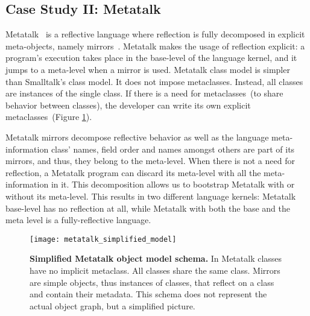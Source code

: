 
\subsection{Case Study II: Metatalk} \label{sec:bootstrap_metatalk}

Metatalk~\cite{Papo11a} is a reflective language where reflection is fully decomposed in explicit meta-objects, namely mirrors~\cite{Brac04b}. Metatalk makes the usage of reflection explicit: a program's execution takes place in the base-level of the language kernel, and it jumps to a meta-level when a mirror is used. Metatalk class model is simpler than Smalltalk's class model. It does not impose metaclasses. Instead, all classes are instances of the single  class. If there is a need for metaclasses~(to share behavior between classes), the developer can write its own explicit metaclasses~(Figure \ref{fig:metatalk_simplified_model}).

Metatalk mirrors decompose reflective behavior as well as the language meta-information \ie class' names, field order and names amongst others are part of its mirrors, and thus, they belong to the meta-level. When there is not a need for reflection, a Metatalk program can discard its meta-level with all the meta-information in it. This decomposition allows us to bootstrap Metatalk with or without its meta-level. This results in two different language kernels: Metatalk base-level has no reflection at all, while Metatalk with both the base and the meta level is a fully-reflective language.

\begin{figure}[ht]
\center
\texttt{[image: metatalk\_simplified\_model]}
\caption{\textbf{Simplified Metatalk object model schema.} In Metatalk classes have no implicit metaclass. All classes share the same class. Mirrors are simple objects, thus instances of classes, that reflect on a class and contain their metadata. This schema does not represent the actual object graph, but a simplified picture.\label{fig:metatalk_simplified_model}}
\end{figure}

